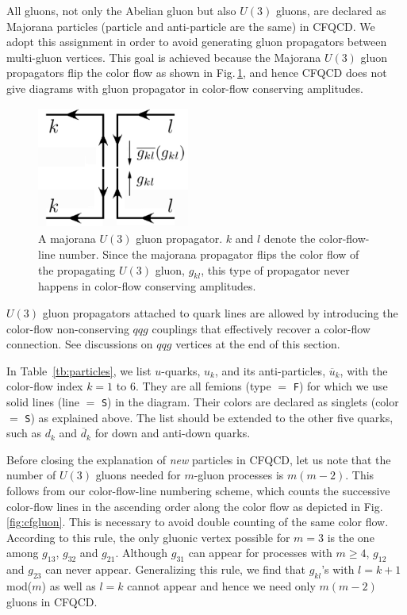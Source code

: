\documentclass[a4paper,11pt]{article}
\begin{document}
All gluons, not only the Abelian gluon but also $U(3)$ gluons, are declared as Majorana particles (particle and anti-particle are the same)
in CFQCD. We adopt this assignment in order to avoid generating
gluon propagators between multi-gluon vertices. This goal is achieved because the
Majorana $U(3)$ gluon propagators flip the color flow as shown in Fig.\,\ref{fig:majoprop}, and hence
CFQCD does not give diagrams with gluon propagator in color-flow
conserving amplitudes.
\begin{figure}
\begin{center}
\includegraphics[width=50mm,height=40mm]{./figures/majoprop3.eps}
\caption{A majorana $U(3)$ gluon propagator. $k$ and $l$ denote the
 color-flow-line number. Since the majorana propagator
 flips the color flow of the propagating $U(3)$ gluon, $g_{kl}$, this type of
 propagator never happens in color-flow conserving amplitudes. }
\label{fig:majoprop}
\end{center}
\end{figure}
$U(3)$ gluon propagators attached to quark lines
are allowed by introducing the color-flow non-conserving $qqg$ couplings
that effectively recover a color-flow connection. See discussions on $qqg$
vertices at the end of this section.

In Table~\ref{tb:particles}, we list $u$-quarks, $u_k$, and its
anti-particles, $\overline{u}_k$, with the color-flow index $k=1$
to $6$. They are all femions (type $=$ {\tt F}) for which we use solid
lines (line $=$ {\tt S}) in the diagram. Their colors are declared as
singlets (color $=$ {\tt S}) as explained above. The list should be
extended to the other five quarks, such as $d_k$ and $\overline{d}_k$ for down and anti-down quarks.

Before closing the explanation of {\it new} particles in CFQCD, let us note
 that the number of $U(3)$ gluons needed for $m$-gluon processes is $m(m-2)$. This follows from
our color-flow-line numbering scheme, which counts the successive
color-flow lines in the
ascending order along the color flow as depicted in
Fig.\,\ref{fig:cfgluon}. This is necessary to avoid
double counting of the same color flow. According to this rule, the only
gluonic vertex possible for $m=3$ is the one among $g_{13}$, $g_{32}$ and
$g_{21}$. Although $g_{31}$ can appear
 for processes
 with $m\geq4$, $g_{12}$ and $g_{23}$ can
never appear. Generalizing this rule, we find that $g_{kl}$'s with $l=k+1$ mod($m$) as well as $l=k$ cannot appear and hence we need only $m(m-2)$ gluons in CFQCD.
\end{document}

